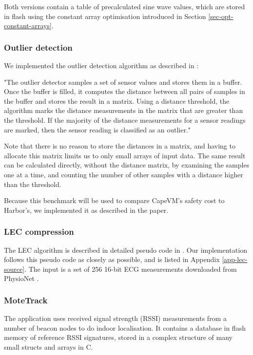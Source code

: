 Both versions contain a table of precalculated sine wave values, which are stored in flash using the constant array optimisation introduced in Section \ref{sec-opt-constant-arrays}.

\subsubsection{Outlier detection}
We implemented the outlier detection algorithm as described in \cite{Kumar:2007ge}:

\begin{displayquote}
"The outlier detector samples a set of sensor values and stores them in a buffer. Once the buffer is filled, it computes the distance between all pairs of samples in the buffer and stores the result in a matrix. Using a distance threshold, the algorithm marks the distance measurements in the matrix that are greater than the threshold. If the majority of the distance measurements for a sensor readings are marked, then the sensor reading is classified as an outlier."
\end{displayquote}

Note that there is no reason to store the distances in a matrix, and having to allocate this matrix limits us to only small arrays of input data. The same result can be calculated directly, without the distance matrix, by examining the samples one at a time, and counting the number of other samples with a distance higher than the threshold.

Because this benchmark will be used to compare CapeVM's safety cost to Harbor's, we implemented it as described in the paper.

\subsubsection{LEC compression}
The LEC algorithm is described in detailed pseudo code in \cite{Marcelloni:2009ja}. Our implementation follows this pseudo code as closely as possible, and is listed in Appendix \ref{app-lec-source}. The input is a set of 256 16-bit ECG measurements downloaded from PhysioNet \cite{physionet-ecg-data}.

\subsubsection{MoteTrack}
\label{sec-evaluation-benchmark-implementation-motetrack}
The  application uses received signal strength (RSSI) measurements from a number of beacon nodes to do indoor localisation. It contains a database in flash memory of reference RSSI signatures, stored in a complex structure of many small structs and arrays in C.

